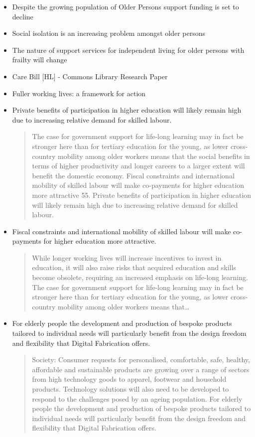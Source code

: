 \begin{itemize}
	\item Despite the growing population of Older Persons support funding is set to decline
	\item Social isolation is an increasing problem amongst older persons
	\item The nature of support services for independent living for older persons with frailty will change
	\item Care Bill [HL] - Commons Library Research Paper
	\item Fuller working lives: a framework for action
	\item Private benefits of participation in higher education will likely remain high due to increasing relative demand for skilled labour.
	\begin{quotation}
		The case for government support for life-long learning may in fact be stronger here than for tertiary education for the young, as lower cross-country mobility among older workers means that the social benefits in terms of higher productivity and longer careers to a larger extent will benefit the domestic economy. Fiscal constraints and international mobility of skilled labour will make co-payments for higher education more attractive 55. Private benefits of participation in higher education will likely remain high due to increasing relative demand for skilled labour.\end{quotation}
	\item Fiscal constraints and international mobility of skilled labour will make co-payments for higher education more attractive.
	\begin{quotation}
		While longer working lives will increase incentives to invest in education, it will also raise risks that acquired education and skills become obsolete, requiring an increased emphasis on life-long learning. The case for government support for life-long learning may in fact be stronger here than for tertiary education for the young, as lower cross-country mobility among older workers means that\dots\end{quotation}
	\item For elderly people the development and production of bespoke products tailored to individual needs will particularly benefit from the design freedom and flexibility that Digital Fabrication offers.
	\begin{quotation}
		Society: Consumer requests for personalised, comfortable, safe, healthy, affordable and sustainable products are growing over a range of sectors from high technology goods to apparel, footwear and household products. Technology solutions will also need to be developed to respond to the challenges posed by an ageing population. For elderly people the development and production of bespoke products tailored to individual needs will particularly benefit from the design freedom and flexibility that Digital Fabrication offers.\end{quotation}

\end{itemize}
